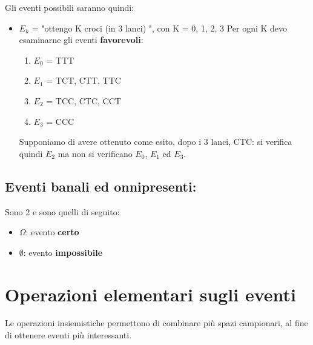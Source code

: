 \documentclass{report}
\begin{document}
Gli eventi possibili saranno quindi:
\begin{itemize}
    \item \(E_k\) = "ottengo K croci (in 3 lanci) ", con K = 0, 1, 2, 3
    Per ogni K devo esaminarne gli eventi \textbf{favorevoli}:
    \begin{enumerate}
        \item \(E_0\) = {TTT}
        \item \(E_1\) = {TCT, CTT, TTC}
        \item \(E_2\) = {TCC, CTC, CCT}
        \item \(E_3\) = {CCC}
    \end{enumerate}
    Supponiamo di avere ottenuto come esito, dopo i 3 lanci, CTC: si verifica quindi \(E_2\) ma non si verificano \(E_0\), \(E_1\) ed \(E_3\).
\end{itemize}

\subsection{Eventi banali ed onnipresenti:}
Sono 2 e sono quelli di seguito:
\begin{itemize}
    \item \(\Omega\): evento \textbf{certo}
    \item \(\emptyset\): evento \textbf{impossibile}
\end{itemize}

\section{Operazioni elementari sugli eventi}

Le operazioni insiemistiche permettono di combinare più spazi campionari, al fine di ottenere eventi più interessanti.
\end{document}

